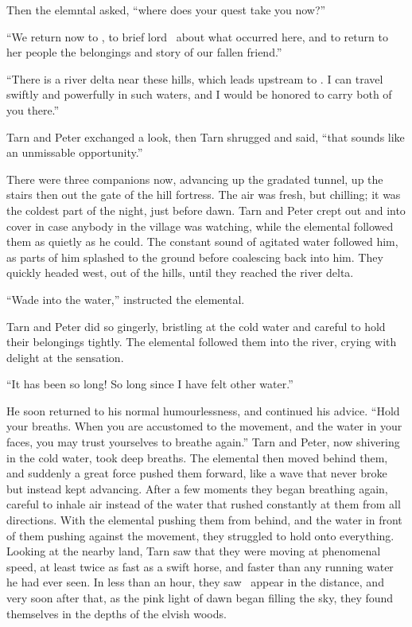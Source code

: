 Then the elemntal asked, ``where does your quest take you now?''

``We return now to \inarthonor, to brief lord \arilor\ about what occurred here, and to return to her people the belongings and story of our fallen friend.''

``There is a river delta near these hills, which leads upstream to \inarthonor.  I can travel swiftly and powerfully in such waters, and I would be honored to carry both of you there.''

Tarn and Peter exchanged a look, then Tarn shrugged and said, ``that sounds like an unmissable opportunity.''

There were three companions now, advancing up the gradated tunnel, up the stairs then out the gate of the hill fortress.  The air was fresh, but chilling; it was the coldest part of the night, just before dawn.  Tarn and Peter crept out and into cover in case anybody in the village was watching, while the elemental followed them as quietly as he could.  The constant sound of agitated water followed him, as parts of him splashed to the ground before coalescing back into him.  They quickly headed west, out of the hills, until they reached the river delta.

``Wade into the water,'' instructed the elemental.

Tarn and Peter did so gingerly, bristling at the cold water and careful to hold their belongings tightly.  The elemental followed them into the river, crying with delight at the sensation.

``It has been so long!  So long since I have felt other water.''

He soon returned to his normal humourlessness, and continued his advice.  ``Hold your breaths.  When you are accustomed to the movement, and the water in your faces, you may trust yourselves to breathe again.''  Tarn and Peter, now shivering in the cold water, took deep breaths.  The elemental then moved behind them, and suddenly a great force pushed them forward, like a wave that never broke but instead kept advancing.  After a few moments they began breathing again, careful to inhale air instead of the water that rushed constantly at them from all directions.  With the elemental pushing them from behind, and the water in front of them pushing against the movement, they struggled to hold onto everything.  Looking at the nearby land, Tarn saw that they were moving at phenomenal speed, at least twice as fast as a swift horse, and faster than any running water he had ever seen.  In less than an hour, they saw \inarthonor\ appear in the distance, and very soon after that, as the pink light of dawn began filling the sky, they found themselves in the depths of the elvish woods.

